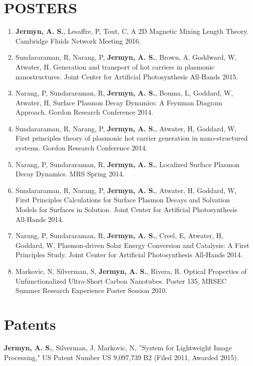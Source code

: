 \documentclass[line, margin]{res3address}
\begin{document}
\begin{resume}
\section{POSTERS}
\begin{enumerate}[leftmargin=10pt]
\item \textbf{Jermyn, A. S.}, Lesaffre, P, Tout, C, A 2D Magnetic Mixing Length Theory. Cambridge Fluids Network Meeting 2016.
\item Sundararaman, R, Narang, P, \textbf{Jermyn, A. S.}, Brown, A, Goddward, W, Atwater, H, Generation and transport of hot carriers in plasmonic nanostructures. Joint Center for Artificial Photosynthesis All-Hands 2015.
\item Narang, P, Sundararaman, R, \textbf{Jermyn, A. S.}, Bouma, L, Goddard, W, Atwater, H, Surface Plasmon Decay Dynamics: A Feynman Diagram Approach. Gordon Research Conference 2014.
\item Sundararaman, R, Narang, P, \textbf{Jermyn, A. S.}, Atwater, H, Goddard, W, First principles theory of plasmonic hot carrier generation in nano-structured systems. Gordon Research Conference 2014.
\item Narang, P, Sundararaman, R, \textbf{Jermyn, A. S.}, Localized Surface Plasmon Decay Dynamics. MRS Spring 2014.
\item Sundararaman, R, Narang, P, \textbf{Jermyn, A. S.}, Atwater, H, Goddard, W, First Principles Calculations for Surface Plasmon Decays and Solvation Models for Surfaces in Solution. Joint Center for Artificial Photosynthesis All-Hands 2014.
\item Narang, P, Sundararaman, R, \textbf{Jermyn, A. S.}, Creel, E, Atwater, H, Goddard, W, Plasmon-driven Solar Energy Conversion and Catalysis: A First Principles Study. Joint Center for Artificial Photosynthesis All-Hands 2014.
\item Markovic, N, Silverman, S, \textbf{Jermyn, A. S.}, Rivera, R. Optical Properties of Unfunctionalized Ultra-Short Carbon Nanotubes. Poster 135, MRSEC Summer Research Experience Poster Session 2010. 
\end{enumerate}

\section{Patents}
\textbf{Jermyn, A. S.}, Silverman, J, Markovic, N, ''System for Lightweight Image Processing," US Patent Number US 9,097,739 B2 (Filed 2011, Awarded 2015).


\end{resume}
\end{document}
